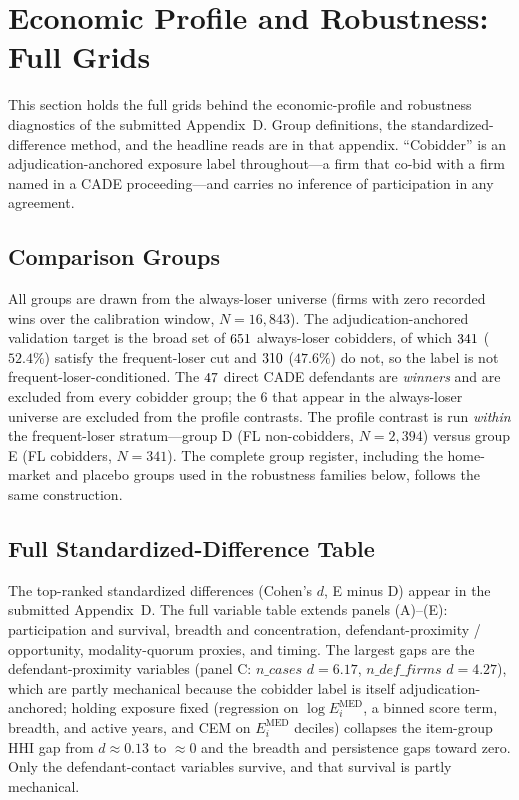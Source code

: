\section{Economic Profile and Robustness: Full Grids}
\label{supp:profile}

This section holds the full grids behind the economic-profile and
robustness diagnostics of the submitted Appendix~D. Group definitions,
the standardized-difference method, and the headline reads are in that
appendix. ``Cobidder'' is an adjudication-anchored exposure label
throughout---a firm that co-bid with a firm named in a CADE
proceeding---and carries no inference of participation in any agreement.

\subsection{Comparison Groups}
\label{supp:profile_groups}

All groups are drawn from the always-loser universe (firms with zero
recorded wins over the calibration window, $N=16{,}843$). The
adjudication-anchored validation target is the broad set of
$651$ always-loser cobidders, of which $341$
($52.4\%$) satisfy the frequent-loser cut and $310$
($47.6\%$) do not, so the label is not frequent-loser-conditioned. The
$47$ direct CADE defendants are \emph{winners} and are
excluded from every cobidder group; the $6$ that appear in the
always-loser universe are excluded from the profile contrasts. The
profile contrast is run \emph{within} the frequent-loser stratum---group
D (FL non-cobidders, $N=2{,}394$) versus group E (FL cobidders,
$N=341$). The complete group register, including the home-market and
placebo groups used in the robustness families below, follows the same
construction.

\subsection{Full Standardized-Difference Table}
\label{supp:profile_smd_full}

The top-ranked standardized differences (Cohen's $d$, E minus D) appear
in the submitted Appendix~D. The full variable table extends panels
(A)--(E): participation and survival, breadth and concentration,
defendant-proximity / opportunity, modality-quorum proxies, and timing.
The largest gaps are the defendant-proximity variables (panel C:
$n\_cases$ $d=6.17$, $n\_def\_firms$ $d=4.27$), which are partly
mechanical because the cobidder label is itself adjudication-anchored;
holding exposure fixed (regression on $\log E_i^{\mathrm{MED}}$, a binned
score term, breadth, and active years, and CEM on $E_i^{\mathrm{MED}}$
deciles) collapses the item-group HHI gap from $d\approx 0.13$ to
$\approx 0$ and the breadth and persistence gaps toward zero. Only the
defendant-contact variables survive, and that survival is partly
mechanical.

